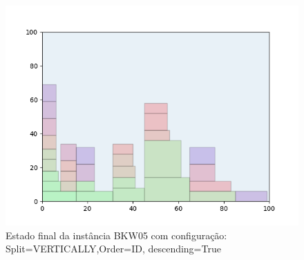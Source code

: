 \begin{figure}[H]
    \centering
    \caption[]{Estado final da instância BKW05 com configuração: Split=VERTICALLY,Order=ID, descending=True}
    \label{fig:bkw05-vertically-id-true}
    \includegraphics[scale=0.5]{output/figures/bkw/bkw05/vertically/id/true/00}
\end{figure}